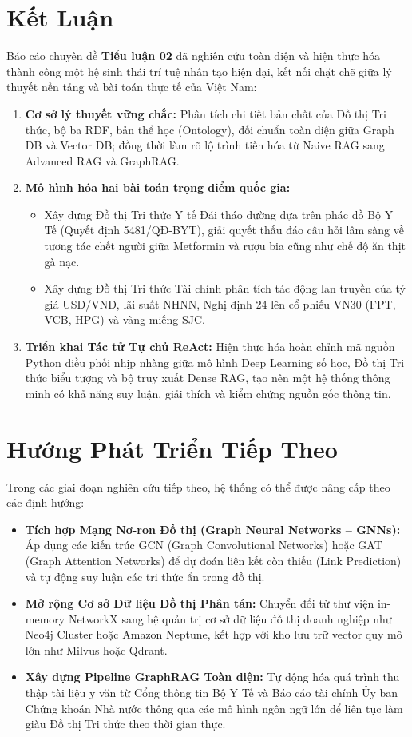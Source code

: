 \documentclass[12pt,a4paper]{report}
\begin{document}
\section{Kết Luận}
Báo cáo chuyên đề \textbf{Tiểu luận 02} đã nghiên cứu toàn diện và hiện thực hóa thành công một hệ sinh thái trí tuệ nhân tạo hiện đại, kết nối chặt chẽ giữa lý thuyết nền tảng và bài toán thực tế của Việt Nam:
\begin{enumerate}[itemsep=2pt, parsep=0pt, topsep=3pt]
    \item \textbf{Cơ sở lý thuyết vững chắc:} Phân tích chi tiết bản chất của Đồ thị Tri thức, bộ ba RDF, bản thể học (Ontology), đối chuẩn toàn diện giữa Graph DB và Vector DB; đồng thời làm rõ lộ trình tiến hóa từ Naive RAG sang Advanced RAG và GraphRAG.
    \item \textbf{Mô hình hóa hai bài toán trọng điểm quốc gia:}
    \begin{itemize}[itemsep=1pt, parsep=0pt, topsep=2pt]
        \item Xây dựng Đồ thị Tri thức Y tế Đái tháo đường dựa trên phác đồ Bộ Y Tế (Quyết định 5481/QĐ-BYT), giải quyết thấu đáo câu hỏi lâm sàng về tương tác chết người giữa Metformin và rượu bia cũng như chế độ ăn thịt gà nạc.
        \item Xây dựng Đồ thị Tri thức Tài chính phân tích tác động lan truyền của tỷ giá USD/VND, lãi suất NHNN, Nghị định 24 lên cổ phiếu VN30 (FPT, VCB, HPG) và vàng miếng SJC.
    \end{itemize}
    \item \textbf{Triển khai Tác tử Tự chủ ReAct:} Hiện thực hóa hoàn chỉnh mã nguồn Python điều phối nhịp nhàng giữa mô hình Deep Learning số học, Đồ thị Tri thức biểu tượng và bộ truy xuất Dense RAG, tạo nên một hệ thống thông minh có khả năng suy luận, giải thích và kiểm chứng nguồn gốc thông tin.
\end{enumerate}

\section{Hướng Phát Triển Tiếp Theo}
Trong các giai đoạn nghiên cứu tiếp theo, hệ thống có thể được nâng cấp theo các định hướng:
\begin{itemize}[itemsep=2pt, parsep=0pt, topsep=3pt]
    \item \textbf{Tích hợp Mạng Nơ-ron Đồ thị (Graph Neural Networks -- GNNs):} Áp dụng các kiến trúc GCN (Graph Convolutional Networks) hoặc GAT (Graph Attention Networks) để dự đoán liên kết còn thiếu (Link Prediction) và tự động suy luận các tri thức ẩn trong đồ thị.
    \item \textbf{Mở rộng Cơ sở Dữ liệu Đồ thị Phân tán:} Chuyển đổi từ thư viện in-memory NetworkX sang hệ quản trị cơ sở dữ liệu đồ thị doanh nghiệp như Neo4j Cluster hoặc Amazon Neptune, kết hợp với kho lưu trữ vector quy mô lớn như Milvus hoặc Qdrant.
    \item \textbf{Xây dựng Pipeline GraphRAG Toàn diện:} Tự động hóa quá trình thu thập tài liệu y văn từ Cổng thông tin Bộ Y Tế và Báo cáo tài chính Ủy ban Chứng khoán Nhà nước thông qua các mô hình ngôn ngữ lớn để liên tục làm giàu Đồ thị Tri thức theo thời gian thực.
\end{itemize}
\end{document}
